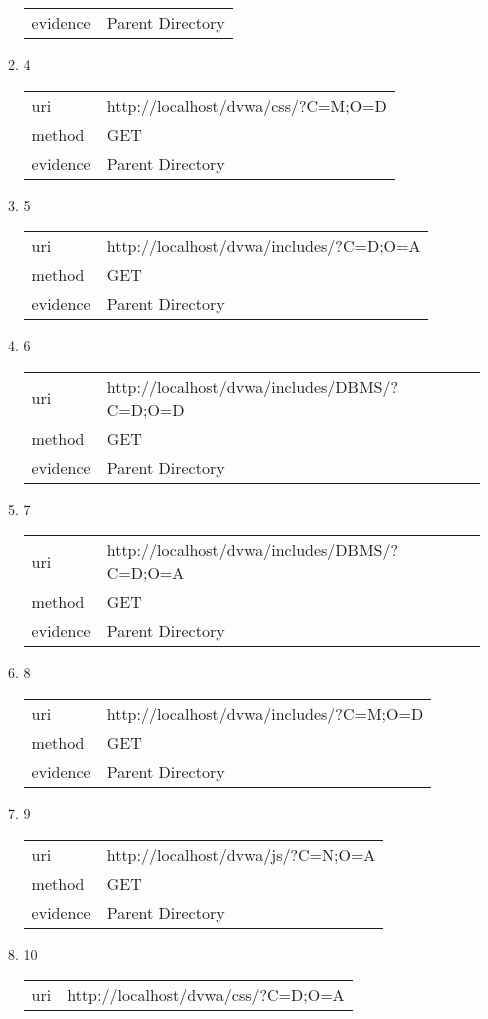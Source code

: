 \documentclass[10pt]{article}
\begin{document}
\begin{itemize}
\begin{enumerate}
\begin{tabular}{| l | p{14cm}}
evidence & Parent Directory \\
\end{tabular}
\item[] 4
\begin{tabular}{| l | p{14cm}}
uri & http://localhost/dvwa/css/?C=M;O=D \\
method & GET \\
evidence & Parent Directory \\
\end{tabular}
\item[] 5
\begin{tabular}{| l | p{14cm}}
uri & http://localhost/dvwa/includes/?C=D;O=A \\
method & GET \\
evidence & Parent Directory \\
\end{tabular}
\item[] 6
\begin{tabular}{| l | p{14cm}}
uri & http://localhost/dvwa/includes/DBMS/?C=D;O=D \\
method & GET \\
evidence & Parent Directory \\
\end{tabular}
\item[] 7
\begin{tabular}{| l | p{14cm}}
uri & http://localhost/dvwa/includes/DBMS/?C=D;O=A \\
method & GET \\
evidence & Parent Directory \\
\end{tabular}
\item[] 8
\begin{tabular}{| l | p{14cm}}
uri & http://localhost/dvwa/includes/?C=M;O=D \\
method & GET \\
evidence & Parent Directory \\
\end{tabular}
\item[] 9
\begin{tabular}{| l | p{14cm}}
uri & http://localhost/dvwa/js/?C=N;O=A \\
method & GET \\
evidence & Parent Directory \\
\end{tabular}
\item[] 10
\begin{tabular}{| l | p{14cm}}
uri & http://localhost/dvwa/css/?C=D;O=A \\

\end{tabular}
\end{enumerate}
\end{itemize}
\end{document}
